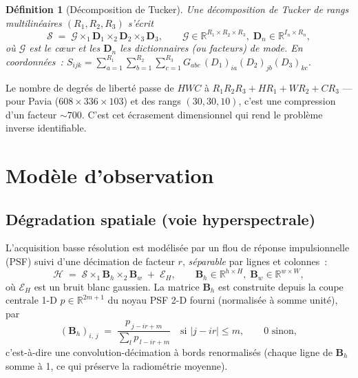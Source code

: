\documentclass[11pt,a4paper]{article}
\newtheorem{definition}{Définition}
\newcommand{\R}{\mathbb{R}}
\newcommand{\T}[1]{\bm{\mathcal{#1}}}          %
\newcommand{\M}[1]{\bm{#1}}                     %
\begin{document}
\begin{definition}[Décomposition de Tucker]
Une décomposition de Tucker de rangs multilinéaires $(R_1,R_2,R_3)$ s'écrit
\begin{equation}
  \T{S} \;=\; \T{G}\times_1 \M{D}_1 \times_2 \M{D}_2 \times_3 \M{D}_3,
  \qquad
  \T{G}\in\R^{R_1\times R_2\times R_3},\;
  \M{D}_n\in\R^{I_n\times R_n},
  \label{eq:tucker}
\end{equation}
où $\T{G}$ est le \emph{c\oe ur} et les $\M{D}_n$ les \emph{dictionnaires} (ou
facteurs) de mode. En coordonnées~:
$S_{ijk}=\sum_{a=1}^{R_1}\sum_{b=1}^{R_2}\sum_{c=1}^{R_3}
G_{abc}\,(D_1)_{ia}(D_2)_{jb}(D_3)_{kc}$.
\end{definition}

Le nombre de degrés de liberté passe de $HWC$ à
$R_1R_2R_3 + HR_1 + WR_2 + CR_3$ — pour Pavia ($608\times336\times103$) et des
rangs $(30,30,10)$, c'est une compression d'un facteur $\sim 700$. C'est cet
écrasement dimensionnel qui rend le problème inverse identifiable.

\section{Modèle d'observation}
\label{sec:observation}

\subsection{Dégradation spatiale (voie hyperspectrale)}

L'acquisition basse résolution est modélisée par un flou de réponse
impulsionnelle (PSF) suivi d'une décimation de facteur $r$, \emph{séparable}
par lignes et colonnes~:
\begin{equation}
  \T{H} \;=\; \T{S}\times_1 \M{B}_h \times_2 \M{B}_w \;+\; \T{E}_H,
  \qquad \M{B}_h\in\R^{h\times H},\; \M{B}_w\in\R^{w\times W},
  \label{eq:degH}
\end{equation}
où $\T{E}_H$ est un bruit blanc gaussien. La matrice $\M{B}_h$ est construite
depuis la coupe centrale 1-D $p\in\R^{2m+1}$ du noyau PSF 2-D fourni
(normalisée à somme unité), par
\begin{equation}
  (\M{B}_h)_{i,\,j} \;=\; \frac{p_{\,j-ir+m}}
  {\sum_{l} p_{\,l-ir+m}}
  \quad\text{si } |j-ir|\le m,\qquad 0\text{ sinon},
  \label{eq:psfmat}
\end{equation}
c'est-à-dire une convolution-décimation à bords renormalisés (chaque ligne de
$\M{B}_h$ somme à 1, ce qui préserve la radiométrie moyenne).
\end{document}
